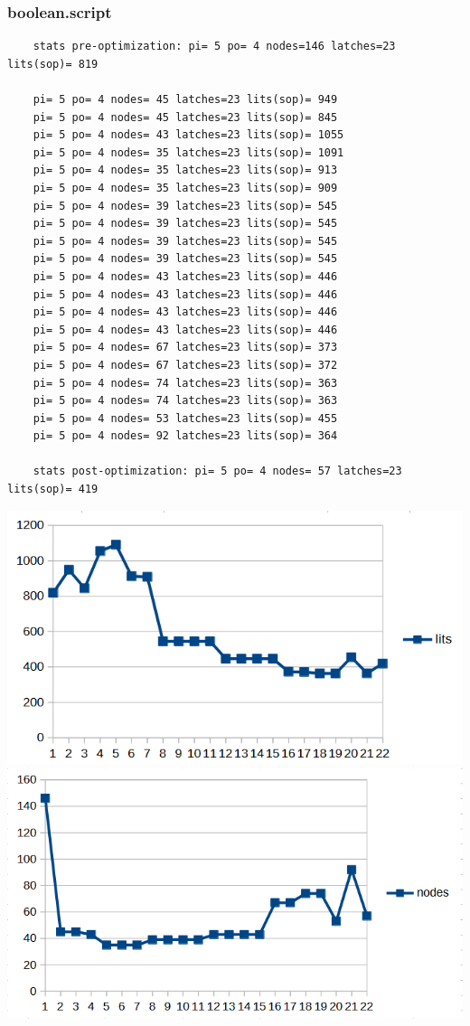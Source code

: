 \documentclass[a4paper,11pt]{article}
\begin{document}
\subsubsection{boolean.script}
    \begin{verbatim}
    stats pre-optimization: pi= 5 po= 4 nodes=146 latches=23 lits(sop)= 819
    
    pi= 5 po= 4 nodes= 45 latches=23 lits(sop)= 949
    pi= 5 po= 4 nodes= 45 latches=23 lits(sop)= 845
    pi= 5 po= 4 nodes= 43 latches=23 lits(sop)= 1055
    pi= 5 po= 4 nodes= 35 latches=23 lits(sop)= 1091
    pi= 5 po= 4 nodes= 35 latches=23 lits(sop)= 913
    pi= 5 po= 4 nodes= 35 latches=23 lits(sop)= 909
    pi= 5 po= 4 nodes= 39 latches=23 lits(sop)= 545
    pi= 5 po= 4 nodes= 39 latches=23 lits(sop)= 545
    pi= 5 po= 4 nodes= 39 latches=23 lits(sop)= 545
    pi= 5 po= 4 nodes= 39 latches=23 lits(sop)= 545
    pi= 5 po= 4 nodes= 43 latches=23 lits(sop)= 446
    pi= 5 po= 4 nodes= 43 latches=23 lits(sop)= 446
    pi= 5 po= 4 nodes= 43 latches=23 lits(sop)= 446
    pi= 5 po= 4 nodes= 43 latches=23 lits(sop)= 446
    pi= 5 po= 4 nodes= 67 latches=23 lits(sop)= 373
    pi= 5 po= 4 nodes= 67 latches=23 lits(sop)= 372
    pi= 5 po= 4 nodes= 74 latches=23 lits(sop)= 363
    pi= 5 po= 4 nodes= 74 latches=23 lits(sop)= 363
    pi= 5 po= 4 nodes= 53 latches=23 lits(sop)= 455
    pi= 5 po= 4 nodes= 92 latches=23 lits(sop)= 364
    
    stats post-optimization: pi= 5 po= 4 nodes= 57 latches=23 lits(sop)= 419
    \end{verbatim}
    \begin{center}
        \includegraphics[width=0.6\linewidth]{assets/Charts/BooleanL.png}
        \includegraphics[width=0.6\linewidth]{assets/Charts/BooleanN.png}
    \end{center}
    
\end{document}
